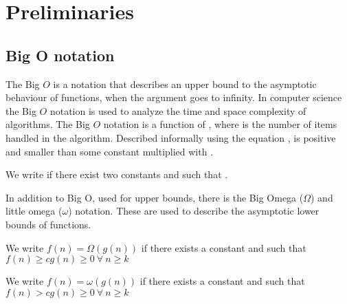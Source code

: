 \section{Preliminaries}

\subsection{Big O notation}

 The Big $O$ is a notation that describes an upper bound to the asymptotic behaviour of functions, when the argument goes to infinity. In computer science the Big $O$ notation is used to analyze the time and space complexity of algorithms. The Big $O$ notation is a function of , where  is the number of items handled in the algorithm. Described informally using the equation ,  is positive and smaller than some constant multiplied with .
 
 \begin{definition}
 We write  if there exist two constants
  and  such that .
 \end{definition}

In addition to Big O, used for upper bounds, there is the Big Omega ($\Omega$) and little omega ($\omega$) notation. These are used to describe the asymptotic lower bounds of functions. 

 \begin{definition}
 We write $f(n) = \Omega(g(n))$ if there exists a constant
  and  such that $f(n) \geq cg(n) \geq 0 \: \forall \: n \geq k$
 \end{definition}

 \begin{definition}
 We write $f(n) = \omega(g(n))$ if there exists a constant
  and  such that $f(n) > cg(n) \geq 0 \: \forall \: n \geq k$
 \end{definition}

